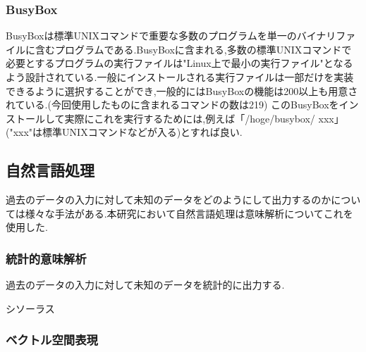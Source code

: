 \subsubsection{BusyBox}
\label{tech:BusyBox}
BusyBoxは標準UNIXコマンドで重要な多数のプログラムを単一のバイナリファイルに含むプログラムである.BusyBoxに含まれる,多数の標準UNIXコマンドで必要とするプログラムの実行ファイルは"Linux上で最小の実行ファイル"となるよう設計されている.一般にインストールされる実行ファイルは一部だけを実装できるように選択することができ,一般的にはBusyBoxの機能は200以上も用意されている.\cite{busybox}(今回使用したものに含まれるコマンドの数は219)
このBusyBoxをインストールして実際にこれを実行するためには,例えば「/hoge/busybox/ xxx」("xxx"は標準UNIXコマンドなどが入る)とすれば良い.

\subsection{自然言語処理}
\label{tech:NLP}
過去のデータの入力に対して未知のデータをどのようにして出力するのかについては様々な手法がある.本研究において自然言語処理は意味解析についてこれを使用した.

\subsubsection{統計的意味解析}
\label{tech:tokei}
過去のデータの入力に対して未知のデータを統計的に出力する.

\label{tech:Markov}

\label{tech:Copus}

\label{tech:Siso}
シソーラス\cite{siso}

\subsubsection{ベクトル空間表現}
\label{tech:Vector}

\label{tech:Word2vec}

